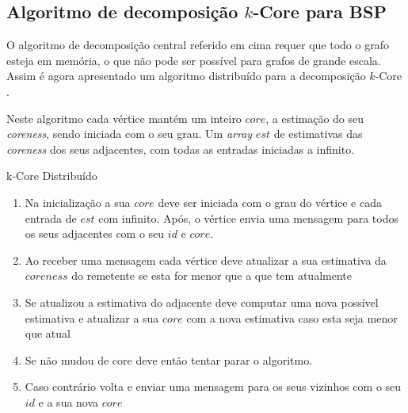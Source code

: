 \newpage
\subsection{Algoritmo de decomposição $k$-Core para BSP}
O algoritmo de decomposição central referido em cima requer que todo o grafo esteja em memória, o que não pode ser possível para grafos de grande escala. Assim é agora apresentado um algoritmo distribuído para a decomposição $k$-Core \cite{kCoreDis}.



%

Neste algoritmo cada vértice mantém um inteiro $core$, a estimação do seu \textit{coreness}, sendo iniciada com o seu grau. Um \textit{array} $est$ de estimativas das \textit{coreness} dos seus adjacentes, com todas as entradas iniciadas a infinito. %

\begin{algorithm}
\caption{k-Core Distribuído}

\begin{enumerate}
	\item Na inicialização a sua $core$ deve ser iniciada com o grau do vértice e cada entrada de $est$ com infinito. Após, o vértice envia uma mensagem para todos os seus adjacentes com o seu $id$ e $core$.
	\item Ao receber uma mensagem cada vértice deve atualizar a sua estimativa da $coreness$ do remetente se esta for menor que a que tem atualmente
	\item Se atualizou a estimativa do adjacente deve computar uma nova possível estimativa e atualizar a sua $core$ com a nova estimativa caso esta seja menor que atual
	\item Se não mudou de core deve então tentar parar o algoritmo.
	\item Caso contrário volta e enviar uma mensagem para os seus vizinhos com o seu $id$ e a sua nova $core$
\end{enumerate}
\end{algorithm}

